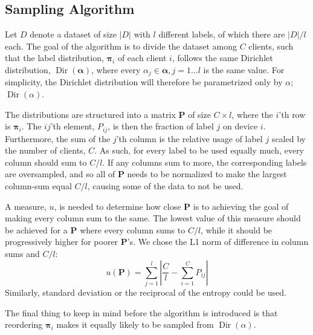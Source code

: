 \documentclass{article}
\newcommand{\len}[1]{\ensuremath{\left\lvert#1\right\rvert}}
\begin{document}
\subsection{Sampling Algorithm}%
\label{app:diralg}
Let $D$ denote a dataset of size $\len D$ with $l$ different labels, of which there are $\len D/l$ each.
The goal of the algorithm is to divide the dataset among $C$ clients, such that the label distribution, $\bm\pi_i$ of each client $i$, follows the same Dirichlet distribution, $\operatorname{Dir}(\bm\alpha)$, where every $\alpha_j\in\bm\alpha, j=1\ldots l$ is the same value.
For simplicity, the Dirichlet distribution will therefore be parametrized only by $\alpha$; $\operatorname{Dir}(\alpha)$.

The distributions are structured into a matrix $\mathbf P$ of size $ C\times l $, where the $i$'th row is $\bm\pi_i$.
The $ij$'th element, $P_{ij}$, is then the fraction of label $j$ on device $i$.
Furthermore, the sum of the $j$'th column is the relative usage of label $j$ scaled by the number of clients, $C$.
As such, for every label to be used equally much, every column should sum to $C/l$.
If any columns sum to more, the corresponding labels are oversampled, and so all of $\bm P$ needs to be normalized to make the largest column-sum equal $C/l$, causing some of the data to not be used.

A measure, $u$, is needed to determine how close $\mathbf P$ is to achieving the goal of making every column sum to the same.
The lowest value of this measure should be achieved for a $\mathbf P$ where every column sums to $C/l$, while it should be progressively higher for poorer $\mathbf P$'s.
We chose the L1 norm of difference in column sums and $C/l$:
\begin{equation*}
    u(\mathbf P) = \sum_{j=1}^{l} \len{\frac{C}{l} - \sum_{i=1}^{C} P_{ij}}
\end{equation*}
Similarly, standard deviation or the reciprocal of the entropy could be used.

The final thing to keep in mind before the algorithm is introduced is that reordering $\bm\pi_i$ makes it equally likely to be sampled from $ \operatorname{Dir}(\alpha) $.
\end{document}
